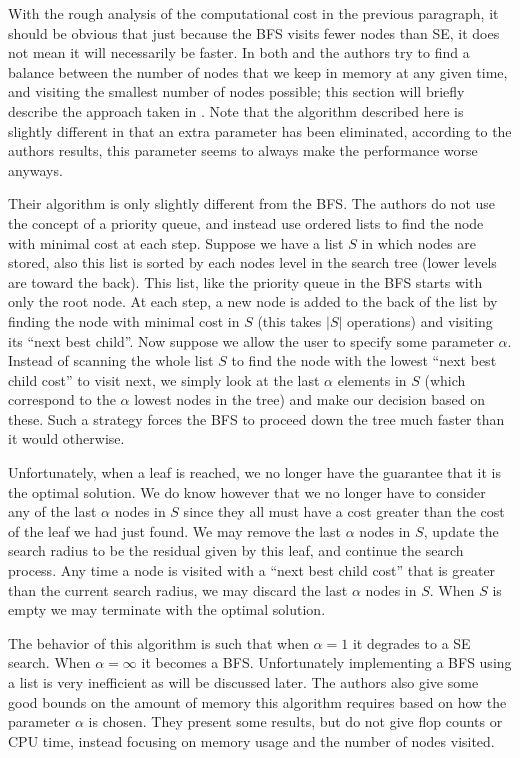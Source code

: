 \documentclass[12pt,Bold,letterpaper]{mcgilletdclass}
\begin{document}
With the rough analysis of the computational cost in the previous paragraph, it should be obvious that just because the BFS visits fewer nodes than SE, it does not mean it will necessarily be faster. In both \cite{DaiY08} and \cite{StuBF07} the authors try to find a balance between the number of nodes that we keep in memory at any given time, and visiting the smallest number of nodes possible; this section will briefly describe the approach taken in \cite{StuBF07}. Note that the algorithm described here is slightly different in that an extra parameter has been eliminated, according to the authors results, this parameter seems to always make the performance worse anyways.

Their algorithm is only slightly different from the BFS. The authors do not use the concept of a priority queue, and instead use ordered lists to find the node with minimal cost at each step. Suppose we have a list $S$ in which nodes are stored, also this list is sorted by each nodes level in the search tree (lower levels are toward the back). This list, like the priority queue in the BFS starts with only the root node. At each step, a new node is added to the back of the list by finding the node with minimal cost in $S$ (this takes $|S|$ operations) and visiting its ``next best child''. Now suppose we allow the user to specify some parameter $\alpha$. Instead of scanning the whole list $S$ to find the node with the lowest ``next best child cost'' to visit next, we simply look at the last $\alpha$ elements in $S$ (which correspond to the $\alpha$ lowest nodes in the tree) and make our decision based on these. Such a strategy forces the BFS to proceed down the tree much faster than it would otherwise.

Unfortunately, when a leaf is reached, we no longer have the guarantee that it is the optimal solution. We do know however that we no longer have to consider any of the last $\alpha$ nodes in $S$ since they all must have a cost greater than the cost of the leaf we had just found. We may remove the last $\alpha$ nodes in $S$, update the search radius to be the residual given by this leaf, and continue the search process. Any time a node is visited with a ``next best child cost'' that is greater than the current search radius, we may discard the last $\alpha$ nodes in $S$. When $S$ is empty we may terminate with the optimal solution.

The behavior of this algorithm is such that when $\alpha = 1$ it degrades to a SE search. When $\alpha = \infty$ it becomes a BFS. Unfortunately implementing a BFS using a list is very inefficient as will be discussed later. The authors also give some good bounds on the amount of memory this algorithm requires based on how the parameter $\alpha$ is chosen. They present some results, but do not give flop counts or CPU time, instead focusing on memory usage and the number of nodes visited.
\end{document}
